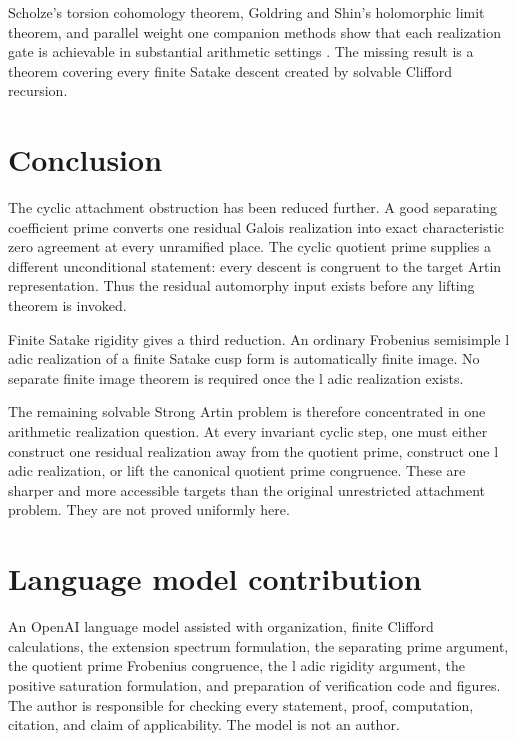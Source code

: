 \documentclass{aomart}
\theoremstyle{definition}
\theoremstyle{remark}
\begin{document}
Scholze's torsion cohomology theorem, Goldring and Shin's holomorphic limit theorem, and parallel weight one companion methods show that each realization gate is achievable in substantial arithmetic settings \cite{Scholze2015,GoldringShin2014,GeeKassaei2013,DimitrovWiese2020}. The missing result is a theorem covering every finite Satake descent created by solvable Clifford recursion.

\section{Conclusion}\label{sec:conclusion}

The cyclic attachment obstruction has been reduced further. A good separating coefficient prime converts one residual Galois realization into exact characteristic zero agreement at every unramified place. The cyclic quotient prime supplies a different unconditional statement: every descent is congruent to the target Artin representation. Thus the residual automorphy input exists before any lifting theorem is invoked.

Finite Satake rigidity gives a third reduction. An ordinary Frobenius semisimple l adic realization of a finite Satake cusp form is automatically finite image. No separate finite image theorem is required once the l adic realization exists.

The remaining solvable Strong Artin problem is therefore concentrated in one arithmetic realization question. At every invariant cyclic step, one must either construct one residual realization away from the quotient prime, construct one l adic realization, or lift the canonical quotient prime congruence. These are sharper and more accessible targets than the original unrestricted attachment problem. They are not proved uniformly here.

\section*{Language model contribution}
An OpenAI language model assisted with organization, finite Clifford calculations, the extension spectrum formulation, the separating prime argument, the quotient prime Frobenius congruence, the l adic rigidity argument, the positive saturation formulation, and preparation of verification code and figures. The author is responsible for checking every statement, proof, computation, citation, and claim of applicability. The model is not an author.



\end{document}
